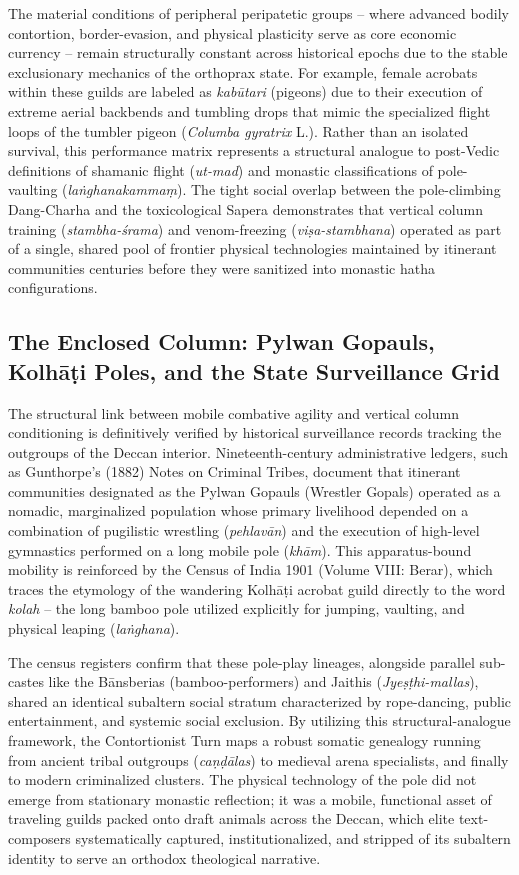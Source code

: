 \documentclass[11pt,twoside,letterpaper]{article}
\begin{document}
The material conditions of peripheral peripatetic groups – where advanced bodily contortion, border-evasion, and physical plasticity serve as core economic currency – remain structurally constant across historical epochs due to the stable exclusionary mechanics of the orthoprax state. For example, female acrobats within these guilds are labeled as \textit{kabūtari} (pigeons) due to their execution of extreme aerial backbends and tumbling drops that mimic the specialized flight loops of the tumbler pigeon (\textit{Columba gyratrix} L.). Rather than an isolated survival, this performance matrix represents a structural analogue to post-Vedic definitions of shamanic flight (\textit{ut-mad}) and monastic classifications of pole-vaulting (\textit{laṅghanakammaṃ}). The tight social overlap between the pole-climbing Dang-Charha and the toxicological Sapera demonstrates that vertical column training (\textit{stambha-śrama}) and venom-freezing (\textit{viṣa-stambhana}) operated as part of a single, shared pool of frontier physical technologies maintained by itinerant communities centuries before they were sanitized into monastic hatha configurations.

\subsection{The Enclosed Column: Pylwan Gopauls, Kolhāṭi Poles, and the State Surveillance Grid}
The structural link between mobile combative agility and vertical column conditioning is definitively verified by historical surveillance records tracking the outgroups of the Deccan interior. Nineteenth-century administrative ledgers, such as Gunthorpe’s (1882) Notes on Criminal Tribes, document that itinerant communities designated as the Pylwan Gopauls (Wrestler Gopals) operated as a nomadic, marginalized population whose primary livelihood depended on a combination of pugilistic wrestling (\textit{pehlavān}) and the execution of high-level gymnastics performed on a long mobile pole (\textit{khām}). This apparatus-bound mobility is reinforced by the Census of India 1901 (Volume VIII: Berar), which traces the etymology of the wandering Kolhāṭi acrobat guild directly to the word \textit{kolah} – the long bamboo pole utilized explicitly for jumping, vaulting, and physical leaping (\textit{laṅghana}).

The census registers confirm that these pole-play lineages, alongside parallel sub-castes like the Bānsberias (bamboo-performers) and Jaithis (\textit{Jyeṣṭhi-mallas}), shared an identical subaltern social stratum characterized by rope-dancing, public entertainment, and systemic social exclusion. By utilizing this structural-analogue framework, the Contortionist Turn maps a robust somatic genealogy running from ancient tribal outgroups (\textit{caṇḍālas}) to medieval arena specialists, and finally to modern criminalized clusters. The physical technology of the pole did not emerge from stationary monastic reflection; it was a mobile, functional asset of traveling guilds packed onto draft animals across the Deccan, which elite text-composers systematically captured, institutionalized, and stripped of its subaltern identity to serve an orthodox theological narrative.
\end{document}
